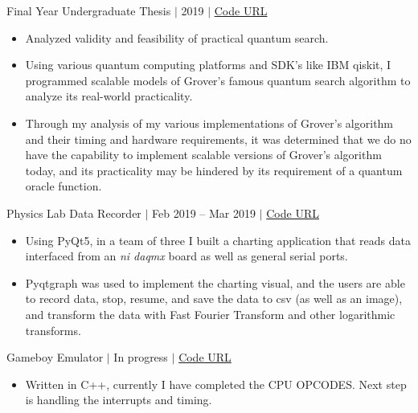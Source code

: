 \documentclass[12pt]{article}
\newcommand{\textDate}[3]{\noindent#1 $|$ #2 $|$ {\color{textGray} #3}}
\begin{document}
    \textDate{Final Year Undergraduate Thesis}{2019}{\href{https://github.com/Sammyalhashe/Thesis/tree/master/Grover}{Code URL}}
    \begin{small}
        \begin{itemize}
            \itemsep0em 
            \item {\color{textGray} Analyzed validity and feasibility of practical quantum search.}
            \item {\color{textGray} Using various quantum computing platforms and SDK's like IBM qiskit, I programmed scalable models of Grover's famous quantum search algorithm to analyze its real-world practicality.}
            \item {\color{textGray} Through my analysis of my various implementations of Grover's algorithm and their timing and hardware requirements, it was determined that we do no have the capability to implement scalable versions of Grover's algorithm today, and its practicality may be hindered by its requirement of a quantum oracle function.}
        \end{itemize}
    \end{small}

    \textDate{Physics Lab Data Recorder}{Feb 2019 -- Mar 2019}{\href{https://github.com/Sammyalhashe/Charter-cp}{Code URL}}
    \begin{small}
        \begin{itemize}
            \itemsep0em 
            \item {\color{textGray} Using PyQt5, in a team of three I built a charting application that reads data interfaced from an \textit{ni daqmx} board as well as general serial ports.}
            \item {\color{textGray} Pyqtgraph was used to implement the charting visual, and the users are able to record data, stop, resume, and save the data to csv (as well as an image), and transform the data with Fast Fourier Transform and other logarithmic transforms.}
        \end{itemize}
    \end{small}

    \textDate{Gameboy Emulator}{In progress}{\href{https://github.com/Sammyalhashe/GameboyEmulator}{Code URL}}
    \begin{small}
        \begin{itemize}
            \itemsep0em 
            \item {\color{textGray} Written in C++, currently I have completed the CPU OPCODES. Next step is handling the interrupts and timing.}
        \end{itemize}
    \end{small}
\end{document}
